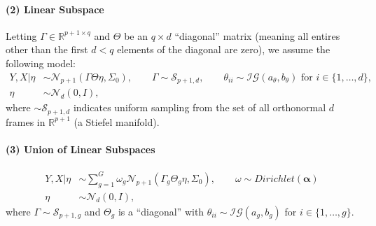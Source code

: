\documentclass{article} %
\newcommand{\Real}{\mathbb{R}}
\providecommand{\mb}[1]{\boldsymbol{#1}}
\providecommand{\mc}[1]{\mathcal{#1}}
\begin{document}
\paragraph{(2) Linear Subspace} Letting $\Gamma \in \Real^{p+1 \times q}$ and $\Theta$ be an ${q \times d}$ ``diagonal'' matrix (meaning all entires other than the first $d < q$ elements of the diagonal are zero), we assume the following model:
	\begin{subequations} \label{eq:linear}
	\begin{align}
		Y,X |\eta &\sim \mc{N}_{p+1}(\Gamma \Theta \eta ,\Sigma_0),\qquad  \Gamma \sim \mc{S}_{p+1,d}, \qquad \theta_{ii} \sim \mc{IG}(a_\theta,b_\theta) \text{ for } i \in \{1, \ldots, d\}, \\
		\eta  &\sim \mc{N}_d(0, I), 
	\end{align}
	\end{subequations}
	where $\sim \mc{S}_{p+1,d}$ indicates uniform sampling from the set of all orthonormal $d$ frames in $\Real^{p+1}$ (a Stiefel manifold).

\paragraph{(3) Union of Linear Subspaces}
\begin{subequations} \label{eq:linear}
\begin{align}
	Y,X |\eta &\sim \sum_{g=1}^G \omega_g \mc{N}_{p+1}(\Gamma_g \Theta_g \eta ,\Sigma_0), \qquad \omega \sim Dirichlet(\mb{\alpha}) \\
	\eta  &\sim \mc{N}_d(0, I), 
\end{align}
\end{subequations}
where $\Gamma \sim \mc{S}_{p+1,g}$ and $\Theta_g$ is a ``diagonal'' with $\theta_{ii} \sim \mc{IG}(a_g,b_g)$ for  $i \in \{1, \ldots, g\}$. %

\end{document}
